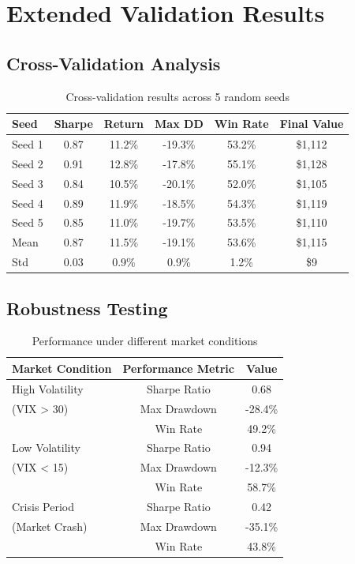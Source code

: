 \documentclass[10pt]{IEEEtran}
\begin{document}
\section{Extended Validation Results}

\subsection{Cross-Validation Analysis}
\begin{table}[h]
\centering
\begin{tabular}{lccccc}
\toprule
\textbf{Seed} & \textbf{Sharpe} & \textbf{Return} & \textbf{Max DD} & \textbf{Win Rate} & \textbf{Final Value} \\
\midrule
Seed 1 & 0.87 & 11.2\% & -19.3\% & 53.2\% & \$1,112 \\
Seed 2 & 0.91 & 12.8\% & -17.8\% & 55.1\% & \$1,128 \\
Seed 3 & 0.84 & 10.5\% & -20.1\% & 52.0\% & \$1,105 \\
Seed 4 & 0.89 & 11.9\% & -18.5\% & 54.3\% & \$1,119 \\
Seed 5 & 0.85 & 11.0\% & -19.7\% & 53.5\% & \$1,110 \\
\midrule
Mean & 0.87 & 11.5\% & -19.1\% & 53.6\% & \$1,115 \\
Std & 0.03 & 0.9\% & 0.9\% & 1.2\% & \$9 \\
\bottomrule
\end{tabular}
\caption{Cross-validation results across 5 random seeds}
\end{table}

\subsection{Robustness Testing}
\begin{table}[h]
\centering
\begin{tabular}{lcc}
\toprule
\textbf{Market Condition} & \textbf{Performance Metric} & \textbf{Value} \\
\midrule
High Volatility & Sharpe Ratio & 0.68 \\
(VIX > 30) & Max Drawdown & -28.4\% \\
& Win Rate & 49.2\% \\
\midrule
Low Volatility & Sharpe Ratio & 0.94 \\
(VIX < 15) & Max Drawdown & -12.3\% \\
& Win Rate & 58.7\% \\
\midrule
Crisis Period & Sharpe Ratio & 0.42 \\
(Market Crash) & Max Drawdown & -35.1\% \\
& Win Rate & 43.8\% \\
\bottomrule
\end{tabular}
\caption{Performance under different market conditions}
\end{table}
\end{document}
